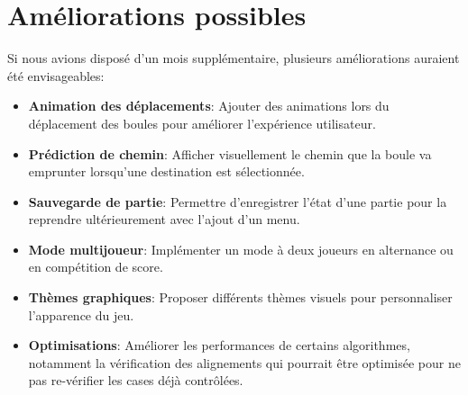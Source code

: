 \section{Améliorations possibles}\label{ameliorations}

Si nous avions disposé d'un mois supplémentaire, plusieurs améliorations auraient été envisageables:

\begin{itemize}
    \item \textbf{Animation des déplacements}: Ajouter des animations lors du déplacement des boules pour améliorer l'expérience utilisateur.
    
    \item \textbf{Prédiction de chemin}: Afficher visuellement le chemin que la boule va emprunter lorsqu'une destination est sélectionnée.
    
    \item \textbf{Sauvegarde de partie}: Permettre d'enregistrer l'état d'une partie pour la reprendre ultérieurement avec l'ajout d'un menu.
    
    \item \textbf{Mode multijoueur}: Implémenter un mode à deux joueurs en alternance ou en compétition de score.
    
    \item \textbf{Thèmes graphiques}: Proposer différents thèmes visuels pour personnaliser l'apparence du jeu.
    
   
    \item \textbf{Optimisations}: Améliorer les performances de certains algorithmes, notamment la vérification des alignements qui pourrait être optimisée pour ne pas re-vérifier les cases déjà contrôlées.
\end{itemize}